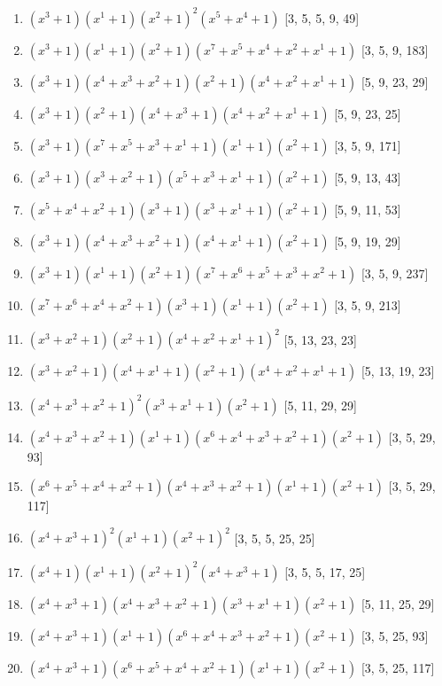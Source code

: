 \documentclass[10pt,twocolumn]{article}
\begin{document}
\begin{enumerate}
\item $(x^{3} + 1)(x^{1} + 1)(x^{2} + 1)^{2}(x^{5} + x^{4} + 1)$  [3, 5, 5, 9, 49]
\item $(x^{3} + 1)(x^{1} + 1)(x^{2} + 1)(x^{7} + x^{5} + x^{4} + x^{2} + x^{1} + 1)$  [3, 5, 9, 183]
\item $(x^{3} + 1)(x^{4} + x^{3} + x^{2} + 1)(x^{2} + 1)(x^{4} + x^{2} + x^{1} + 1)$  [5, 9, 23, 29]
\item $(x^{3} + 1)(x^{2} + 1)(x^{4} + x^{3} + 1)(x^{4} + x^{2} + x^{1} + 1)$  [5, 9, 23, 25]
\item $(x^{3} + 1)(x^{7} + x^{5} + x^{3} + x^{1} + 1)(x^{1} + 1)(x^{2} + 1)$  [3, 5, 9, 171]
\item $(x^{3} + 1)(x^{3} + x^{2} + 1)(x^{5} + x^{3} + x^{1} + 1)(x^{2} + 1)$  [5, 9, 13, 43]
\item $(x^{5} + x^{4} + x^{2} + 1)(x^{3} + 1)(x^{3} + x^{1} + 1)(x^{2} + 1)$  [5, 9, 11, 53]
\item $(x^{3} + 1)(x^{4} + x^{3} + x^{2} + 1)(x^{4} + x^{1} + 1)(x^{2} + 1)$  [5, 9, 19, 29]
\item $(x^{3} + 1)(x^{1} + 1)(x^{2} + 1)(x^{7} + x^{6} + x^{5} + x^{3} + x^{2} + 1)$  [3, 5, 9, 237]
\item $(x^{7} + x^{6} + x^{4} + x^{2} + 1)(x^{3} + 1)(x^{1} + 1)(x^{2} + 1)$  [3, 5, 9, 213]
\item $(x^{3} + x^{2} + 1)(x^{2} + 1)(x^{4} + x^{2} + x^{1} + 1)^{2}$  [5, 13, 23, 23]
\item $(x^{3} + x^{2} + 1)(x^{4} + x^{1} + 1)(x^{2} + 1)(x^{4} + x^{2} + x^{1} + 1)$  [5, 13, 19, 23]
\item $(x^{4} + x^{3} + x^{2} + 1)^{2}(x^{3} + x^{1} + 1)(x^{2} + 1)$  [5, 11, 29, 29]
\item $(x^{4} + x^{3} + x^{2} + 1)(x^{1} + 1)(x^{6} + x^{4} + x^{3} + x^{2} + 1)(x^{2} + 1)$  [3, 5, 29, 93]
\item $(x^{6} + x^{5} + x^{4} + x^{2} + 1)(x^{4} + x^{3} + x^{2} + 1)(x^{1} + 1)(x^{2} + 1)$  [3, 5, 29, 117]
\item $(x^{4} + x^{3} + 1)^{2}(x^{1} + 1)(x^{2} + 1)^{2}$  [3, 5, 5, 25, 25]
\item $(x^{4} + 1)(x^{1} + 1)(x^{2} + 1)^{2}(x^{4} + x^{3} + 1)$  [3, 5, 5, 17, 25]
\item $(x^{4} + x^{3} + 1)(x^{4} + x^{3} + x^{2} + 1)(x^{3} + x^{1} + 1)(x^{2} + 1)$  [5, 11, 25, 29]
\item $(x^{4} + x^{3} + 1)(x^{1} + 1)(x^{6} + x^{4} + x^{3} + x^{2} + 1)(x^{2} + 1)$  [3, 5, 25, 93]
\item $(x^{4} + x^{3} + 1)(x^{6} + x^{5} + x^{4} + x^{2} + 1)(x^{1} + 1)(x^{2} + 1)$  [3, 5, 25, 117]

\end{enumerate}
\end{document}
